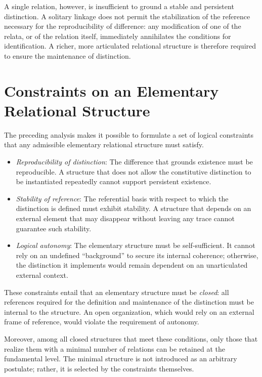 \documentclass[11pt,a4paper]{article}
\begin{document}
A single relation, however, is insufficient to ground a stable and persistent distinction. A solitary linkage does not permit the stabilization of the reference necessary for the reproducibility of difference: any modification of one of the relata, or of the relation itself, immediately annihilates the conditions for identification. A richer, more articulated relational structure is therefore required to ensure the maintenance of distinction.

\section{Constraints on an Elementary Relational Structure}
The preceding analysis makes it possible to formulate a set of logical constraints that any admissible elementary relational structure must satisfy.

\begin{itemize}[label=-]
  \item \emph{Reproducibility of distinction}: The difference that grounds existence must be reproducible. A structure that does not allow the constitutive distinction to be instantiated repeatedly cannot support persistent existence.
  \item \emph{Stability of reference}: The referential basis with respect to which the distinction is defined must exhibit stability. A structure that depends on an external element that may disappear without leaving any trace cannot guarantee such stability.
  \item \emph{Logical autonomy}: The elementary structure must be self‑sufficient. It cannot rely on an undefined “background” to secure its internal coherence; otherwise, the distinction it implements would remain dependent on an unarticulated external context.
\end{itemize}

These constraints entail that an elementary structure must be \emph{closed}: all references required for the definition and maintenance of the distinction must be internal to the structure. An open organization, which would rely on an external frame of reference, would violate the requirement of autonomy.

Moreover, among all closed structures that meet these conditions, only those that realize them with a minimal number of relations can be retained at the fundamental level. The minimal structure is not introduced as an arbitrary postulate; rather, it is selected by the constraints themselves.
\end{document}
